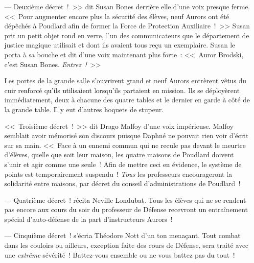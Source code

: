 --- Deuxième décret~!~>> dit Susan Bones derrière elle d'une voix presque ferme. <<~Pour augmenter encore plus la sécurité des élèves, neuf Aurors ont été dépêchés à Poudlard afin de former la Force de Protection Auxiliaire~!~>> Susan prit un petit objet rond en verre, l'un des communicateurs que le département de justice magique utilisait et dont ils avaient tous reçu un exemplaire. Susan le porta à sa bouche et dit d'une voix maintenant plus forte~: <<~Auror Brodski, c'est Susan Bones. \emph{Entrez~!}~>>

Les portes de la grande salle s'ouvrirent grand et neuf Aurors entrèrent vêtus du cuir renforcé qu'ils utilisaient lorsqu'ils partaient en mission. Ils se déployèrent immédiatement, deux à chacune des quatre tables et le dernier en garde à côté de la grande table. Il y eut d'autres hoquets de stupeur.

<<~Troisième décret~!~>> dit Drago Malfoy d'une voix impérieuse. Malfoy semblait avoir mémorisé son discours puisque Daphné ne pouvait rien voir d'écrit sur sa main. <<~Face à un ennemi commun qui ne recule pas devant le meurtre d'élèves, quelle que soit leur maison, les quatre maisons de Poudlard doivent s'unir et agir comme une seule~! Afin de mettre ceci en évidence, le système de points est temporairement suspendu~! \emph{Tous} les professeurs encourageront la solidarité entre maisons, par décret du conseil d'administrations de Poudlard~!

--- Quatrième décret~! récita Neville Londubat. Tous les élèves qui ne se rendent pas encore aux cours du soir du professeur de Défense recevront un entraînement spécial d'auto-défense de la part d'instructeurs Aurors~!

--- Cinquième décret~! s'écria Théodore Nott d'un ton menaçant. Tout combat dans les couloirs ou ailleurs, exception faite des cours de Défense, sera traité avec une \emph{extrême} sévérité~! Battez-vous ensemble ou ne vous battez pas du tout~!

